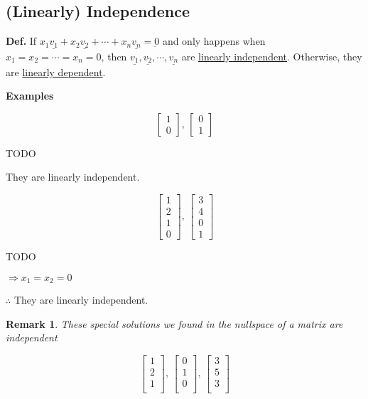 \documentclass[12pt,a4paper]{article}
\newtheorem*{rem}{Remark}
\newcommand{\Remark}[1]{
  \begin{rem}
    \color{cyan}
    #1
  \end{rem}
}
\begin{document}
\subsection*{(Linearly) Independence}

\textbf{Def.} If $x_1\underline{v_1} + x_2\underline{v_2} + \cdots + x_n\underline{v_n} = \underbar{0}$
and only happens when $x_1 = x_2 = \cdots = x_n = 0$, 
then $\underline{v_1}, \underline{v_2}, \cdots, \underline{v_n}$ are \underline{linearly independent}.
Otherwise, they are \underline{linearly dependent}.

\textbf{Examples}

\[
\begin{bmatrix}
  1 \\
  0
\end{bmatrix},\,
\begin{bmatrix}
  0 \\
  1
\end{bmatrix}
\]

TODO

They are linearly independent.

\[
\begin{bmatrix}
  1 \\
  2 \\
  1 \\
  0
\end{bmatrix},\,
\begin{bmatrix}
  3 \\
  4 \\
  0 \\
  1
\end{bmatrix}
\]

TODO

$\Rightarrow x_1 = x_2 = 0$

$\therefore$ They are linearly independent.

\Remark{These special solutions we found in the nullspace of a matrix are independent}

\[
\begin{bmatrix}
  1 \\
  2 \\
  1 \\
\end{bmatrix},\,
\begin{bmatrix}
  0 \\
  1 \\
  0 \\
\end{bmatrix},\,
\begin{bmatrix}
  3 \\
  5 \\
  3 \\
\end{bmatrix}
\]
\end{document}
